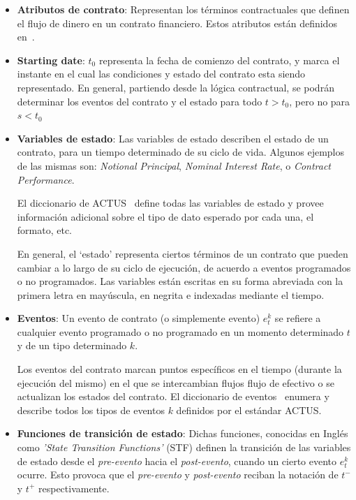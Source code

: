 \documentclass[12pt]{book}
\begin{document}
\begin{itemize}
	\item \textbf{Atributos de contrato}: Representan los términos contractuales que definen el flujo de dinero en un contrato financiero. Estos atributos están definidos en~\cite{ACTUS_Dictionary_Terms}.

	\item \textbf{Starting date}: $t_0$ representa la fecha de comienzo del contrato, y marca el instante en el cual las condiciones y estado del contrato esta siendo representado. En general, partiendo desde la lógica contractual, se podrán determinar los eventos del contrato y el estado para todo $t > t_0$, pero no para $s < t_0$

	\item \textbf{Variables de estado}: Las variables de estado describen el estado de un contrato, para un tiempo determinado de su ciclo de vida. Algunos ejemplos de las mismas son: \textit{Notional Principal}, \textit{Nominal Interest Rate}, o \textit{Contract Performance}.

	      El diccionario de ACTUS~\cite{ACTUS_Dictionary_States} define todas las variables de estado y provee información adicional sobre el tipo de dato esperado por cada una, el formato, etc.

	      En general, el `estado' representa ciertos términos de un contrato que pueden cambiar a lo largo de su ciclo de ejecución, de acuerdo a eventos programados o no programados. Las variables están escritas en su forma abreviada con la primera letra en mayúscula, en negrita e indexadas mediante el tiempo.
	\item \textbf{Eventos}: Un evento de contrato (o simplemente evento) $e^k_t$ se refiere a cualquier evento programado o no programado en un momento determinado $t$ y de un tipo determinado $k$.

	      Los eventos del contrato marcan puntos específicos en el tiempo (durante la ejecución del mismo) en el que se intercambian flujos flujo de efectivo o se actualizan los estados del contrato. El diccionario de eventos~\cite{ACTUS_Dictionary_Events} enumera y describe todos los tipos de eventos $k$ definidos por el estándar ACTUS.\@

	\item \textbf{Funciones de transición de estado}: Dichas funciones, conocidas en Inglés como \textit{'State Transition Functions'} (STF) definen la transición de las variables de estado desde el \textit{pre-evento} hacia el \textit{post-evento}, cuando un cierto evento $e^k_t$ ocurre. Esto provoca que el  \textit{pre-evento} y \textit{post-evento} reciban la notación de $t^-$ y $t^+$ respectivamente.


\end{itemize}
\end{document}
